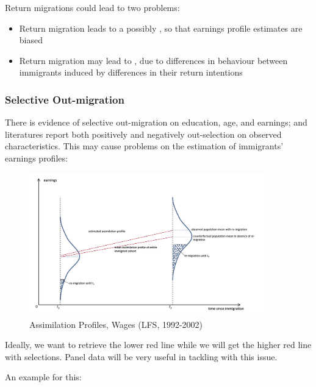             Return migrations could lead to two problems:
            
            \begin{itemize}
                \item Return migration leads to a possibly , so that earnings profile estimates are biased
                \item Return migration may lead to , due to differences in behaviour between immigrants induced by differences in their return intentions
            \end{itemize}

        \subsubsection{Selective Out-migration}

            There is evidence of selective out-migration on education, age, and earnings; and literatures report both positively and negatively out-selection on observed characteristics. This may cause problems on the estimation of immigrants' earnings profiles:

            \begin{figure}[H]
                \centering
                \includegraphics[width=4in]{images/ch11/11_selective_outmig_4.png}
                \caption{Assimilation Profiles, Wages (LFS, 1992-2002)}
            \end{figure}

            Ideally, we want to retrieve the lower red line while we will get the higher red line with selections. Panel data will be very useful in tackling with this issue.
    
            An example for this:
    
